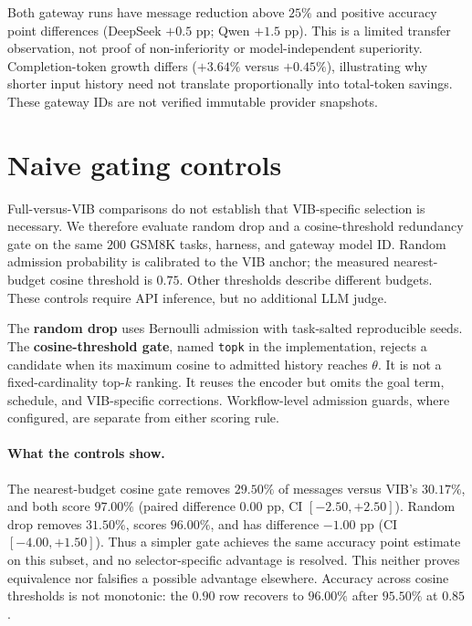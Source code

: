 \documentclass[11pt,twoside,twocolumn,letterpaper]{article}
\begin{document}


Both gateway runs have message reduction above $25\%$ and positive accuracy point differences (DeepSeek $+0.5$ pp; Qwen $+1.5$ pp). This is a limited transfer observation, not proof of non-inferiority or model-independent superiority. Completion-token growth differs ($+3.64\%$ versus $+0.45\%$), illustrating why shorter input history need not translate proportionally into total-token savings. These gateway IDs are not verified immutable provider snapshots.

\section{Naive gating controls}\label{app:gating_controls}

Full-versus-VIB comparisons do not establish that VIB-specific selection is necessary. We therefore evaluate random drop and a cosine-threshold redundancy gate on the same $200$ GSM8K tasks, harness, and gateway model ID. Random admission probability is calibrated to the VIB anchor; the measured nearest-budget cosine threshold is $0.75$. Other thresholds describe different budgets. These controls require API inference, but no additional LLM judge.

The \textbf{random drop} uses Bernoulli admission with task-salted reproducible seeds. The \textbf{cosine-threshold gate}, named \texttt{topk} in the implementation, rejects a candidate when its maximum cosine to admitted history reaches $\theta$. It is not a fixed-cardinality top-$k$ ranking. It reuses the encoder but omits the goal term, schedule, and VIB-specific corrections. Workflow-level admission guards, where configured, are separate from either scoring rule.



\paragraph{What the controls show.} The nearest-budget cosine gate removes $29.50\%$ of messages versus VIB's $30.17\%$, and both score $97.00\%$ (paired difference $0.00$ pp, CI $[-2.50,+2.50]$). Random drop removes $31.50\%$, scores $96.00\%$, and has difference $-1.00$ pp (CI $[-4.00,+1.50]$). Thus a simpler gate achieves the same accuracy point estimate on this subset, and no selector-specific advantage is resolved. This neither proves equivalence nor falsifies a possible advantage elsewhere. Accuracy across cosine thresholds is not monotonic: the $0.90$ row recovers to $96.00\%$ after $95.50\%$ at $0.85$.
\end{document}
